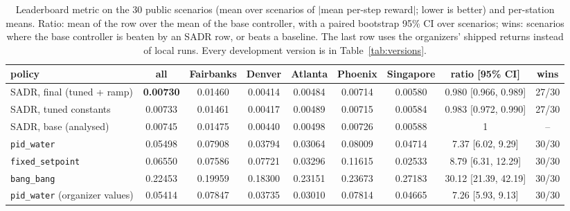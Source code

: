 \begin{table}[t]
\caption{Leaderboard metric on the 30 public scenarios (mean over scenarios of $|$mean per-step reward$|$; lower is better) and per-station means. Ratio: mean of the row over the mean of the base controller, with a paired bootstrap 95\% CI over scenarios; wins: scenarios where the base controller is beaten by an SADR row, or beats a baseline. The last row uses the organizers' shipped returns instead of local runs. Every development version is in Table~\ref{tab:versions}.}
\label{tab:main}
\centering\scriptsize
\setlength{\tabcolsep}{3pt}
\begin{tabular}{lcccccccc}
\toprule
policy & all & Fairbanks & Denver & Atlanta & Phoenix & Singapore & ratio [95\% CI] & wins \\
\midrule
SADR, final (tuned + ramp) & \textbf{0.00730} & 0.01460 & 0.00414 & 0.00484 & 0.00714 & 0.00580 & 0.980 [0.966, 0.989] & 27/30 \\
SADR, tuned constants & 0.00733 & 0.01461 & 0.00417 & 0.00489 & 0.00715 & 0.00584 & 0.983 [0.972, 0.990] & 27/30 \\
SADR, base (analysed) & 0.00745 & 0.01475 & 0.00440 & 0.00498 & 0.00726 & 0.00588 & 1 & -- \\
\midrule
\texttt{pid\_water} & 0.05498 & 0.07908 & 0.03794 & 0.03064 & 0.08009 & 0.04714 & 7.37 [6.02, 9.29] & 30/30 \\
\texttt{fixed\_setpoint} & 0.06550 & 0.07586 & 0.07721 & 0.03296 & 0.11615 & 0.02533 & 8.79 [6.31, 12.29] & 30/30 \\
\texttt{bang\_bang} & 0.22453 & 0.19959 & 0.18300 & 0.23151 & 0.23673 & 0.27183 & 30.12 [21.39, 42.19] & 30/30 \\
\texttt{pid\_water} (organizer values) & 0.05414 & 0.07847 & 0.03735 & 0.03010 & 0.07814 & 0.04665 & 7.26 [5.93, 9.13] & 30/30 \\
\bottomrule
\end{tabular}
\end{table}
